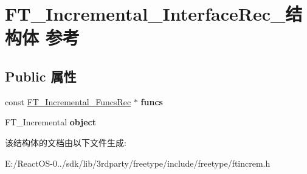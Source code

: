 \hypertarget{struct_f_t___incremental___interface_rec__}{}\section{F\+T\+\_\+\+Incremental\+\_\+\+Interface\+Rec\+\_\+结构体 参考}
\label{struct_f_t___incremental___interface_rec__}
\subsection*{Public 属性}
\begin{DoxyCompactItemize}
\item 
\mbox{\label{struct_f_t___incremental___interface_rec___acd254ae2bdd80b4c9218a484c6bc2a41}} 
const \hyperlink{struct_f_t___incremental___funcs_rec__}{F\+T\+\_\+\+Incremental\+\_\+\+Funcs\+Rec} $\ast$ {\bfseries funcs}
\item 
\mbox{\label{struct_f_t___incremental___interface_rec___ae4f527f53465ff84ad01b484fe721a88}} 
F\+T\+\_\+\+Incremental {\bfseries object}
\end{DoxyCompactItemize}


该结构体的文档由以下文件生成\+:\begin{DoxyCompactItemize}
\item 
E\+:/\+React\+O\+S-\/0../sdk/lib/3rdparty/freetype/include/freetype/ftincrem.\+h\end{DoxyCompactItemize}
